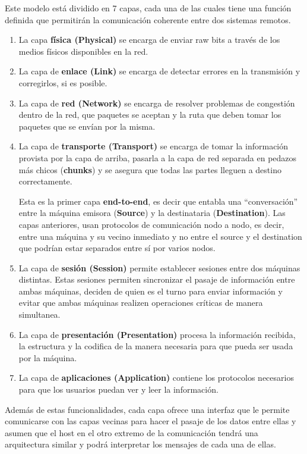 Este modelo está dividido en 7 capas, cada una de las cuales tiene una función definida que permitirán la comunicación coherente entre dos sistemas remotos.  

\begin{enumerate}
  \item La capa \textbf{física (Physical)} se encarga de enviar raw bits a través de los medios físicos disponibles en la red. 
  \item La capa de \textbf{enlace (Link)} se encarga de detectar errores en la transmisión y corregirlos, si es posible.
  \item La capa de \textbf{red (Network)} se encarga de resolver problemas de congestión dentro de la red, que paquetes se aceptan y la ruta que deben tomar los paquetes que se envían por la misma.
  \item La capa de \textbf{transporte (Transport)} se encarga de tomar la información provista por la capa de arriba, pasarla a la capa de red separada en pedazos más chicos (\textbf{chunks}) y se asegura que todas las partes lleguen a destino correctamente. 
  
  Esta es la primer capa \textbf{end-to-end}, es decir que entabla una ``conversación'' entre la máquina emisora (\textbf{Source}) y la destinataria (\textbf{Destination}). Las capas anteriores, usan protocolos de comunicación nodo a nodo, es decir, entre una máquina y su vecino inmediato y no entre el source y el destination que podrían estar separados entre sí por varios nodos.
  
  \item La capa de \textbf{sesión  (Session)} permite establecer sesiones entre dos máquinas distintas. Estas sesiones permiten sincronizar el pasaje de información entre ambas máquinas, deciden de quien es el turno para enviar información y evitar que ambas máquinas realizen operaciones críticas de manera simultanea.
  \item La capa de \textbf{presentación (Presentation)} procesa la información recibida, la estructura y la codifica de la manera necesaria para que pueda ser usada por la máquina.
  \item La capa de \textbf{aplicaciones (Application)} contiene los protocolos necesarios para que los usuarios puedan ver y leer la información.
\end{enumerate}

Además de estas funcionalidades, cada capa ofrece una interfaz que le permite comunicarse con las capas vecinas para hacer el pasaje de los datos entre ellas y asumen que el host en el otro extremo de la comunicación tendrá una arquitectura similar y podrá interpretar los mensajes de cada una de ellas.

